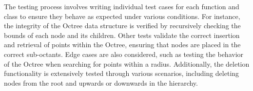 The testing process involves writing individual test cases for each function and class to ensure they
behave as expected under various conditions.
For instance, the integrity of the Octree data structure is verified by recursively checking the bounds of
each node and its children.
Other tests validate the correct insertion and retrieval of points within the Octree,
ensuring that nodes are placed in the correct sub-octants.
Edge cases are also considered, such as testing the behavior of the Octree when searching for points within a radius.
Additionally, the deletion functionality is extensively tested through various scenarios,
including deleting nodes from the root and upwards or downwards in the hierarchy.

